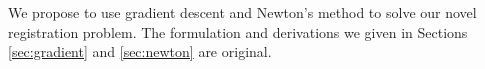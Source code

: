 \documentclass{article} %
\begin{document}
We propose to use gradient descent and Newton's method to solve our novel registration problem. The formulation and derivations we given in Sections \ref{sec:gradient} and \ref{sec:newton} are original.





\end{document}
